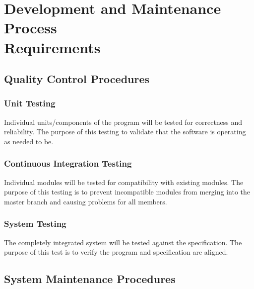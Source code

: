 \documentclass[12pt]{article}
\begin{document}
\section{\texorpdfstring{Development and Maintenance Process \\Requirements}{Development and Maintenance Process Requirements}}

\subsection{Quality Control Procedures}
    \subsubsection{Unit Testing}
    Individual units/components of the program will be tested for correctness and reliability. The purpose of this testing to validate that the software is operating as needed to be.
    
    \subsubsection{Continuous Integration Testing}
    Individual modules will be tested for compatibility with existing modules. The purpose of this testing is to prevent incompatible modules from merging into the master branch and causing problems for all members.
    
    \subsubsection{System Testing}
    The completely integrated system will be tested against the specification. The purpose of this test is to verify the program and specification are aligned.

\subsection{System Maintenance Procedures}
\end{document}
